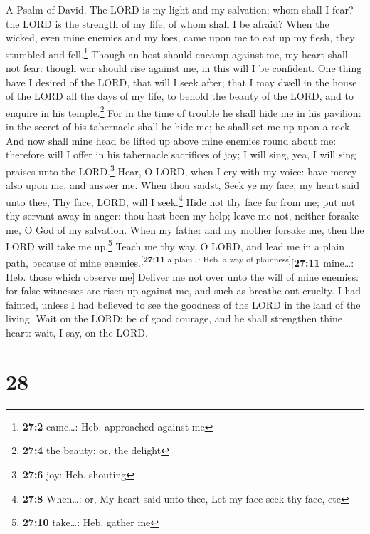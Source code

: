 A Psalm of David.  The LORD is my light and my salvation;
whom shall I fear? the LORD is the strength of my life; of whom shall I
be afraid?  When the wicked, even mine enemies and my
foes, came upon me to eat up my flesh, they stumbled and
fell.\footnote{\textbf{27:2} came\ldots: Heb. approached against me}
 Though an host should encamp against me, my heart shall
not fear: though war should rise against me, in this will I be
confident.  One thing have I desired of the LORD, that
will I seek after; that I may dwell in the house of the LORD all the
days of my life, to behold the beauty of the LORD, and to enquire in his
temple.\footnote{\textbf{27:4} the beauty: or, the delight}
 For in the time of trouble he shall hide me in his
pavilion: in the secret of his tabernacle shall he hide me; he shall set
me up upon a rock.  And now shall mine head be lifted up
above mine enemies round about me: therefore will I offer in his
tabernacle sacrifices of joy; I will sing, yea, I will sing praises unto
the LORD.\footnote{\textbf{27:6} joy: Heb. shouting} 
Hear, O LORD, when I cry with my voice: have mercy also upon me, and
answer me.  When thou saidst, Seek ye my face; my heart
said unto thee, Thy face, LORD, will I seek.\footnote{\textbf{27:8}
  When\ldots: or, My heart said unto thee, Let my face seek thy face,
  etc}  Hide not thy face far from me; put not thy servant
away in anger: thou hast been my help; leave me not, neither forsake me,
O God of my salvation.  When my father and my mother
forsake me, then the LORD will take me up.\footnote{\textbf{27:10}
  take\ldots: Heb. gather me}  Teach me thy way, O LORD,
and lead me in a plain path, because of mine
enemies.\textsuperscript{{[}\textbf{27:11} a plain\ldots: Heb. a way of
plainness{]}}{[}\textbf{27:11} mine\ldots: Heb. those which observe
me{]}  Deliver me not over unto the will of mine enemies:
for false witnesses are risen up against me, and such as breathe out
cruelty.  I had fainted, unless I had believed to see the
goodness of the LORD in the land of the living.  Wait on
the LORD: be of good courage, and he shall strengthen thine heart: wait,
I say, on the LORD.

\hypertarget{section-27}{%
\section{28}\label{section-27}}

